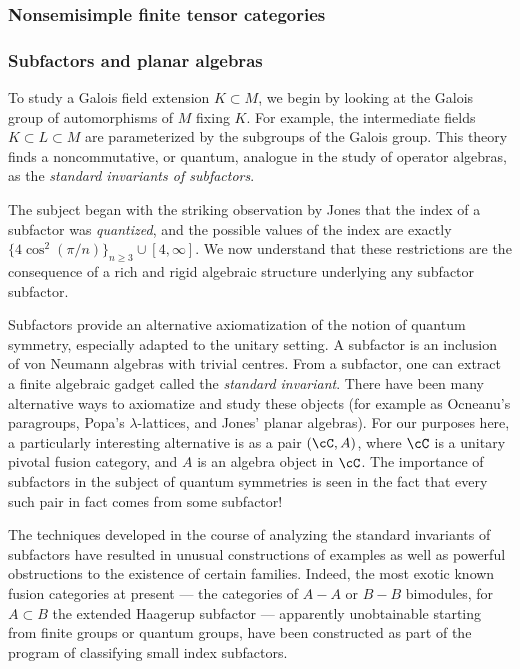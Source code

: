 \documentclass[11pt]{article}
\begin{document}
\subsubsection{Nonsemisimple finite tensor categories}

\subsubsection{Subfactors and planar algebras}

To study a Galois field extension $K \subset M$, we begin by looking at the Galois group of automorphisms of $M$ fixing $K$. For example, the intermediate fields $K \subset L \subset M$ are parameterized by the subgroups of the Galois group. This theory finds a noncommutative, or quantum, analogue in the study of operator algebras, as the \emph{standard invariants of subfactors}.

The subject began with the striking observation by Jones that the index of a subfactor was \emph{quantized}, and the possible values of the index are exactly $\{4 \cos^2(\pi/n)\}_{n \geq 3} \cup [4,\infty]$. We now understand that these restrictions are the consequence of a rich and rigid algebraic structure underlying any subfactor subfactor.

Subfactors provide an alternative axiomatization of the notion of quantum symmetry, especially adapted to the unitary setting. A subfactor is an inclusion of von Neumann algebras with trivial centres. From a subfactor, one can extract a finite algebraic gadget called the \emph{standard invariant}. There have been many alternative ways to axiomatize and study these objects (for example as Ocneanu's paragroups, Popa's $\lambda$-lattices, and Jones' planar algebras). For our purposes here, a particularly interesting alternative is as a pair $(\cC, A)$, where $\cC$ is a unitary pivotal fusion category, and $A$ is an algebra object in $\cC$. The importance of subfactors in the subject of quantum symmetries is seen in the fact that every such pair in fact comes from some subfactor!

The techniques developed in the course of analyzing the standard invariants of subfactors have resulted in unusual constructions of examples as well as powerful obstructions to the existence of certain families. Indeed, the most exotic known fusion categories at present --- the categories of $A-A$ or $B-B$ bimodules, for $A \subset B$ the extended Haagerup subfactor ---
apparently unobtainable starting from finite groups or quantum groups, have been constructed as part of the program of classifying small index subfactors.
\end{document}
